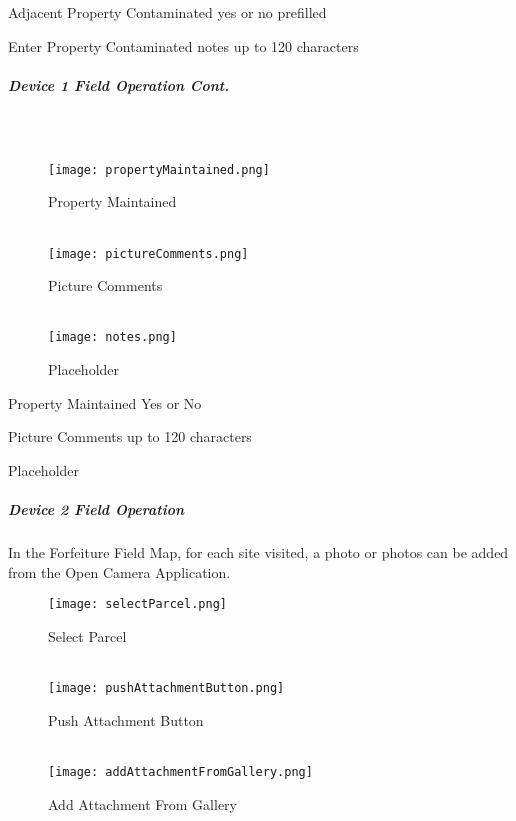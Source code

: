 \documentclass[class=article , crop=false, titlepage, twoside, multi={itemize, figure, verbatim}, float=false]{standalone}
\begin{document}
\noindent Adjacent Property Contaminated yes or no prefilled
\vspace{2in}

\noindent Enter Property Contaminated notes up to 120 characters
\clearpage
\subparagraph*{Device 1 Field Operation Cont.}
\subparagraph*{\\}
\begin{wrapfigure}{r}{0.5\textwidth}
\centering
\texttt{[image: propertyMaintained.png]}
\caption {Property Maintained}
\vspace{.15in}
\HRule \\[.4cm] %
\vspace{.2in}
\texttt{[image: pictureComments.png]}
\caption{Picture Comments}
\vspace{.15in}
\HRule \\[.4cm] %
\vspace{.2in}
\texttt{[image: notes.png]}
\caption{Placeholder}
\end{wrapfigure}
Property Maintained Yes or No\\
\vspace{2in}

\noindent Picture Comments up to 120 characters\\
\vspace{2in}

\noindent Placeholder
\clearpage
\subparagraph{Device 2 Field Operation}In the Forfeiture Field Map, for each site visited, a photo or photos can be added from the Open Camera Application.

\begin{wrapfigure}{r}{0.5\textwidth}
\centering
\texttt{[image: selectParcel.png]}
\caption {Select Parcel}
\vspace{.15in}
\HRule \\[.4cm] %
\vspace{.15in}
\texttt{[image: pushAttachmentButton.png]}
\caption{Push Attachment Button}
\vspace{.15in}
\HRule \\[.4cm] %
\vspace{.15in}
\texttt{[image: addAttachmentFromGallery.png]}
\caption{Add Attachment From Gallery}
\end{wrapfigure}
\vspace{.5in}
\end{document}
